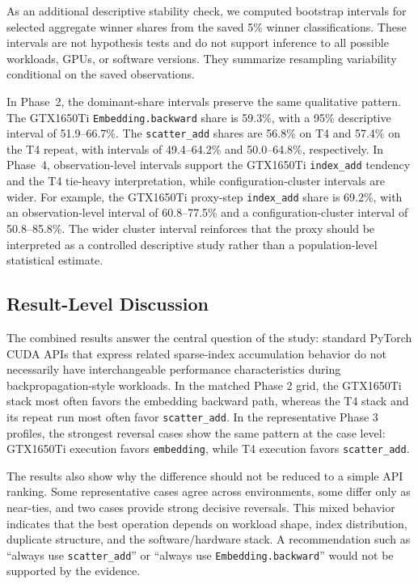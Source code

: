 

As an additional descriptive stability check, we computed bootstrap intervals for selected aggregate winner shares from the saved 5\% winner classifications. These intervals are not hypothesis tests and do not support inference to all possible workloads, GPUs, or software versions. They summarize resampling variability conditional on the saved observations.

In Phase~2, the dominant-share intervals preserve the same qualitative pattern. The GTX1650Ti \texttt{Embedding.backward} share is 59.3\%, with a 95\% descriptive interval of 51.9--66.7\%. The \texttt{scatter\_add} shares are 56.8\% on T4 and 57.4\% on the T4 repeat, with intervals of 49.4--64.2\% and 50.0--64.8\%, respectively. In Phase~4, observation-level intervals support the GTX1650Ti \texttt{index\_add} tendency and the T4 tie-heavy interpretation, while configuration-cluster intervals are wider. For example, the GTX1650Ti proxy-step \texttt{index\_add} share is 69.2\%, with an observation-level interval of 60.8--77.5\% and a configuration-cluster interval of 50.8--85.8\%. The wider cluster interval reinforces that the proxy should be interpreted as a controlled descriptive study rather than a population-level statistical estimate.

\subsection{Result-Level Discussion}

The combined results answer the central question of the study: standard PyTorch CUDA APIs that express related sparse-index accumulation behavior do not necessarily have interchangeable performance characteristics during backpropagation-style workloads. In the matched Phase 2 grid, the GTX1650Ti stack most often favors the embedding backward path, whereas the T4 stack and its repeat run most often favor \texttt{scatter\_add}. In the representative Phase 3 profiles, the strongest reversal cases show the same pattern at the case level: GTX1650Ti execution favors \texttt{embedding}, while T4 execution favors \texttt{scatter\_add}.

The results also show why the difference should not be reduced to a simple API ranking. Some representative cases agree across environments, some differ only as near-ties, and two cases provide strong decisive reversals. This mixed behavior indicates that the best operation depends on workload shape, index distribution, duplicate structure, and the software/hardware stack. A recommendation such as ``always use \texttt{scatter\_add}'' or ``always use \texttt{Embedding.backward}'' would not be supported by the evidence.


